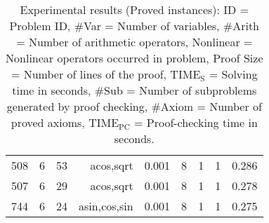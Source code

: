 \begin{table}[h!]
\begin{center}
\begin{tabular}{|l||r|r|r||r|r|r|r|r|}
508 & 6 & 53 & acos,sqrt & 0.001 & 8 & 1 & 1 & 0.286 \\
507 & 6 & 29 & acos,sqrt & 0.001 & 8 & 1 & 1 & 0.278 \\
744 & 6 & 24 & asin,cos,sin & 0.001 & 8 & 1 & 1 & 0.275\\
\hline
\end{tabular}
  \end{center}
  \caption{
    Experimental results (Proved instances):
    ID = Problem ID,
    \#Var = Number of variables,
    \#Arith = Number of arithmetic operators,
    Nonlinear = Nonlinear operators occurred in problem,
    Proof Size = Number of lines of the proof,
    $\mathrm{TIME_S}$ = Solving time in seconds,
    \#Sub = Number of subproblems generated by proof checking,
    \#Axiom = Number of proved axioms,
    $\mathrm{TIME_{PC}}$ = Proof-checking time in seconds.
  }\label{tbl:exp}
\end{table}

